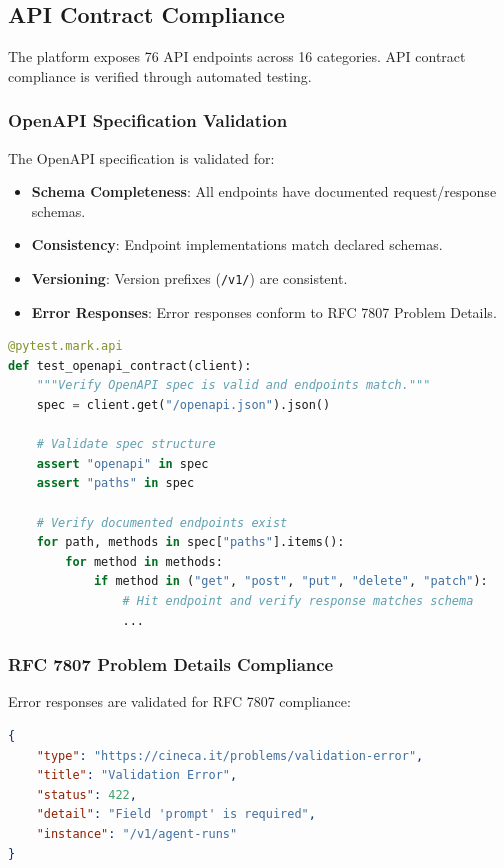 \subsection{API Contract Compliance}

The platform exposes 76 API endpoints across 16 categories. API contract compliance is verified through automated testing.

\subsubsection{OpenAPI Specification Validation}

The OpenAPI specification is validated for:

\begin{itemize}
    \item \textbf{Schema Completeness}: All endpoints have documented request/response schemas.
    \item \textbf{Consistency}: Endpoint implementations match declared schemas.
    \item \textbf{Versioning}: Version prefixes (\texttt{/v1/}) are consistent.
    \item \textbf{Error Responses}: Error responses conform to RFC 7807 Problem Details.
\end{itemize}

\begin{lstlisting}[language=Python,caption={OpenAPI contract test pattern.}]
@pytest.mark.api
def test_openapi_contract(client):
    """Verify OpenAPI spec is valid and endpoints match."""
    spec = client.get("/openapi.json").json()
    
    # Validate spec structure
    assert "openapi" in spec
    assert "paths" in spec
    
    # Verify documented endpoints exist
    for path, methods in spec["paths"].items():
        for method in methods:
            if method in ("get", "post", "put", "delete", "patch"):
                # Hit endpoint and verify response matches schema
                ...
\end{lstlisting}

\subsubsection{RFC 7807 Problem Details Compliance}

Error responses are validated for RFC 7807 compliance:

\begin{lstlisting}[language=json,caption={RFC 7807 Problem Details response format.}]
{
    "type": "https://cineca.it/problems/validation-error",
    "title": "Validation Error",
    "status": 422,
    "detail": "Field 'prompt' is required",
    "instance": "/v1/agent-runs"
}
\end{lstlisting}

